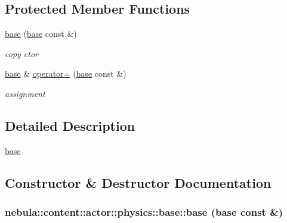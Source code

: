 \subsection*{Protected Member Functions}
\begin{DoxyCompactItemize}
\item 
\hyperlink{classnebula_1_1content_1_1actor_1_1physics_1_1base_ad2c051b95e85c7112f4b1a927a780248}{base} (\hyperlink{classnebula_1_1content_1_1actor_1_1physics_1_1base}{base} const \&)
\begin{DoxyCompactList}\small\item\em copy ctor \item\end{DoxyCompactList}\item 
\hyperlink{classnebula_1_1content_1_1actor_1_1physics_1_1base}{base} \& \hyperlink{classnebula_1_1content_1_1actor_1_1physics_1_1base_a8b950d8d7230bd6899cb3da7b6116f02}{operator=} (\hyperlink{classnebula_1_1content_1_1actor_1_1physics_1_1base}{base} const \&)
\begin{DoxyCompactList}\small\item\em assignment \item\end{DoxyCompactList}\end{DoxyCompactItemize}


\subsection{Detailed Description}
\hyperlink{classnebula_1_1content_1_1actor_1_1physics_1_1base}{base} 

\subsection{Constructor \& Destructor Documentation}
\hypertarget{classnebula_1_1content_1_1actor_1_1physics_1_1base_ad2c051b95e85c7112f4b1a927a780248}{
\subsubsection[{base}]{\setlength{\rightskip}{0pt plus 5cm}nebula::content::actor::physics::base::base ({\bf base} const \&)}}
\label{classnebula_1_1content_1_1actor_1_1physics_1_1base_ad2c051b95e85c7112f4b1a927a780248}


